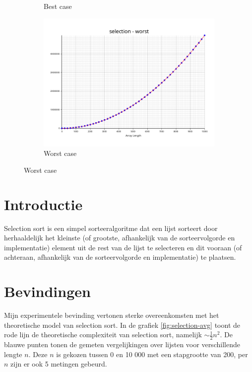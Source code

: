 \documentclass[a4paper]{article}
\begin{document}
\begin{figure}[h]
\begin{subfigure}[b]{0.3\textwidth}
    \caption{Best case}
    \label{fig:selection-best}
  \end{subfigure}
  \begin{subfigure}[b]{0.3\textwidth}
    \includegraphics[width=\textwidth]{../plots/selection-worst.png}
    \caption{Worst case}
    \label{fig:selection-worst}
  \end{subfigure}
\end{figure}

\section{Introductie}

Selection sort is een simpel sorteeralgoritme dat een lijst sorteert door herhaaldelijk het kleinste (of grootste, afhankelijk van de sorteervolgorde en implementatie) element uit de rest van de lijst te selecteren en dit vooraan (of achteraan, afhankelijk van de sorteervolgorde en implementatie) te plaatsen.

\section{Bevindingen}
Mijn experimentele bevinding vertonen sterke overeenkomsten met het theoretische model van selection sort.
In de grafiek \ref{fig:selection-avg} toont de rode lijn de theoretische complexiteit van selection sort, namelijk $\sim \frac{1}{2} n^2$. 
De blauwe punten tonen de gemeten vergelijkingen over lijsten voor verschillende lengte $n$. 
Deze $n$ is gekozen tussen 0 en 10 000 met een stapgrootte van 200, per $n$ zijn er ook 5 metingen gebeurd.
\end{document}
